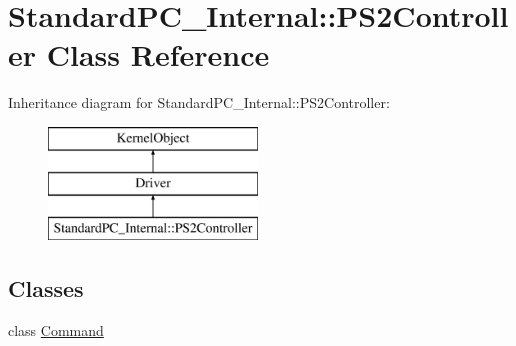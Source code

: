 \hypertarget{class_standard_p_c___internal_1_1_p_s2_controller}{}\section{Standard\+P\+C\+\_\+\+Internal\+:\+:P\+S2\+Controller Class Reference}
\label{class_standard_p_c___internal_1_1_p_s2_controller}
Inheritance diagram for Standard\+P\+C\+\_\+\+Internal\+:\+:P\+S2\+Controller\+:\begin{figure}[H]
\begin{center}
\leavevmode
\includegraphics[height=3.000000cm]{class_standard_p_c___internal_1_1_p_s2_controller}
\end{center}
\end{figure}
\subsection*{Classes}
\begin{DoxyCompactItemize}
\item 
class \hyperlink{class_standard_p_c___internal_1_1_p_s2_controller_1_1_command}{Command}
\end{DoxyCompactItemize}
